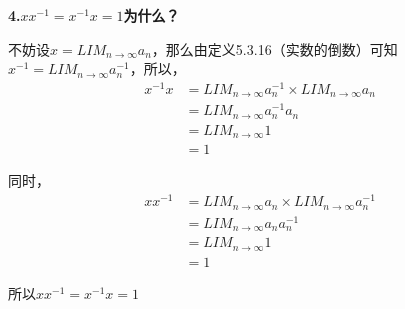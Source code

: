 \documentclass{article}
\theoremstyle{mystyle}
\begin{document}
\textbf{4.$xx^{-1}=x^{-1}x=1$为什么？}

不妨设$x=LIM_{n\rightarrow \infty}a_n$，那么由定义5.3.16（实数的倒数）可知
$x^{-1} = LIM_{n\rightarrow \infty}a_n^{-1}$，所以，
\begin{align*}
  x^{-1}x & = LIM_{n\rightarrow \infty}a_n^{-1} \times LIM_{n\rightarrow \infty}a_n \\
          & = LIM_{n\rightarrow \infty}a_n^{-1} a_n                                 \\
          & = LIM_{n\rightarrow \infty}1                                            \\
          & = 1
\end{align*}

同时，
\begin{align*}
  xx^{-1} & = LIM_{n\rightarrow \infty}a_n \times LIM_{n\rightarrow \infty}a_n^{-1} \\
          & = LIM_{n\rightarrow \infty} a_n a_n^{-1}                                 \\
          & = LIM_{n\rightarrow \infty}1                                            \\
          & = 1
\end{align*}

所以$xx^{-1}=x^{-1}x=1$
\end{document}
